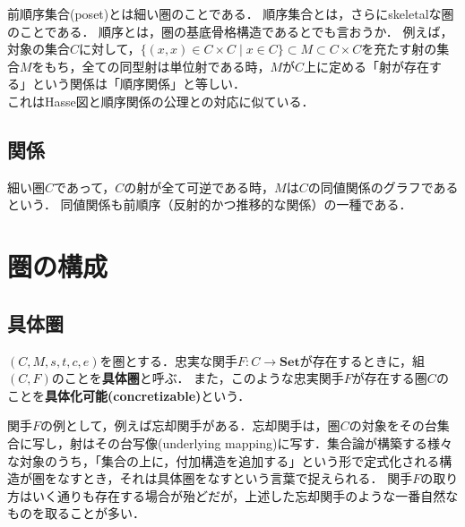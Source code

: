 \documentclass[uplatex, dvipdfmx]{jsreport}
\begin{document}
\begin{screen}
    前順序集合(poset)とは細い圏のことである．
    順序集合とは，さらにskeletalな圏のことである．
    順序とは，圏の基底骨格構造であるとでも言おうか．
    例えば，対象の集合$C$に対して，$\{ (x,x) \in C\times C \mid x\in C \}\subset M\subset C\times C$を充たす射の集合$M$をもち，全ての同型射は単位射である時，$M$が$C$上に定める「射が存在する」という関係は「順序関係」と等しい．\\
    これはHasse図と順序関係の公理との対応に似ている．
\end{screen}

\subsection{関係}

細い圏$C$であって，$C$の射が全て可逆である時，$M$は$C$の同値関係のグラフであるという．
同値関係も前順序（反射的かつ推移的な関係）の一種である．

\section{圏の構成}

\subsection{具体圏}

\begin{definition}
    $(C,M,s,t,c,e)$を圏とする．忠実な関手$F:C\rightarrow \mathbf{Set}$が存在するときに，組$(C,F)$のことを\textbf{具体圏}と呼ぶ．
    また，このような忠実関手$F$が存在する圏$C$のことを\textbf{具体化可能(concretizable)}という．
\end{definition}
\begin{remark}
    関手$F$の例として，例えば忘却関手がある．忘却関手は，圏$C$の対象をその台集合に写し，射はその台写像(underlying mapping)に写す．集合論が構築する様々な対象のうち，「集合の上に，付加構造を追加する」という形で定式化される構造が圏をなすとき，それは具体圏をなすという言葉で捉えられる．
    関手$F$の取り方はいく通りも存在する場合が殆どだが，上述した忘却関手のような一番自然なものを取ることが多い．
\end{remark}
\end{document}
